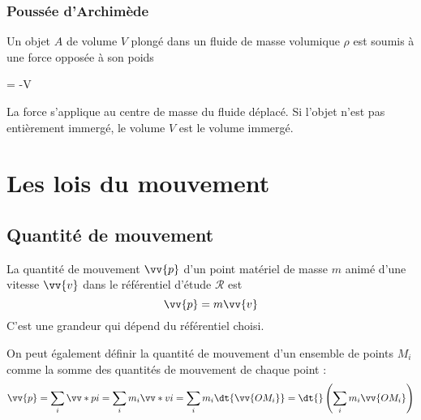 \documentclass{cours}
\begin{document}
\subsubsection{Poussée d'Archimède}%
\label{ssub:poussee_d_archimede}
Un objet $A$ de volume $V$ plongé dans un fluide de masse volumique $\rho$ est soumis à une force opposée à son poids 
\begin{eqencadre}
 = -\rho V 
\end{eqencadre}
\begin{center}
\end{center}
La force s'applique au centre de masse du fluide déplacé. Si l'objet n'est pas entièrement immergé, le volume $V$ est le volume immergé.

\section{Les lois du mouvement}%
\label{sec:les_lois_du_mouvement}

\subsection{Quantité de mouvement}%
\label{sub:quantite_de_mouvement}

\begin{definition}
  La quantité de mouvement $\vv{p}$ d'un point matériel de masse $m$ animé d'une vitesse $\vv{v}$ dans le référentiel d'étude $\mathcal{R}$ est 
  \begin{equation}
  \vv{p} = m \vv{v}
  \end{equation}
 C'est une grandeur qui dépend du référentiel choisi.
\end{definition}

On peut également définir la quantité de mouvement d'un ensemble de points $M_i$ comme la somme des quantités de mouvement de chaque point :
\begin{equation}
\vv{p} = \sum_i \vv*{p}{i} = \sum_i m_i \vv*{v}{i} = \sum_i m_i \dt{\vv{OM_i}} = \dt{}\left( \sum_i m_i \vv{OM_i} \right) 
\end{equation}
\end{document}
